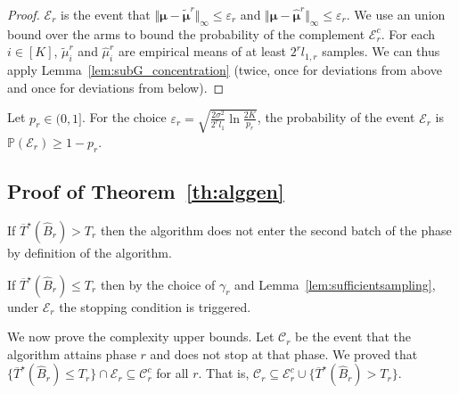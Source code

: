 \begin{proof}
$\mathcal E_r$ is the event that $\Vert \bm\mu - \tilde{\bm\mu}^r \Vert_\infty \le \varepsilon_r$ and $\Vert \bm\mu - \hat{\bm\mu}^r \Vert_\infty \le \varepsilon_r$.
We use an union bound over the arms to bound the probability of the complement $\mathcal{E}_r^c$.
For each $i \in [K]$, $\tilde{\mu}^r_i$ and $\hat{\mu}^r_i$ are empirical means of at least $2^r l_{1,r}$ samples. We can thus apply Lemma~\ref{lem:subG_concentration} (twice, once for deviations from above and once for deviations from below).
\end{proof}

\begin{lemma}\label{lem:proba_Er}
	Let $p_r \in (0,1]$.
	For the choice $\varepsilon_r = \sqrt{\frac{2\sigma^2}{2^r l_1}\ln\frac{2K}{p_r}}$, the probability of the event $\mathcal E_r$ is $\mathbb{P}(\mathcal E_r) \ge 1 - p_r$.
\end{lemma}


\subsection{Proof of Theorem~\ref{th:alggen}}\label{app:ub_proof}

If $\overline{T}^\star(\hat{B}_r) > T_r$ then the algorithm does not enter the second batch of the phase by definition of the algorithm.

If $\overline{T}^\star(\hat{B}_r) \le T_r$ then by the choice of $\gamma_r$ and Lemma~\ref{lem:sufficientsampling}, under $\mathcal E_r$ the stopping condition is triggered.

We now prove the complexity upper bounds. Let $\mathcal C_r$ be the event that the algorithm attains phase $r$ and does not stop at that phase.
We proved that $\{\overline{T}^\star(\hat{B}_r) \le T_r\} \cap \mathcal E_r \subseteq \mathcal C_r^c$ for all $r$. That is, $\mathcal C_r \subseteq \mathcal E_r^c \cup \{\overline{T}^\star(\hat{B}_r) > T_r\}$.

